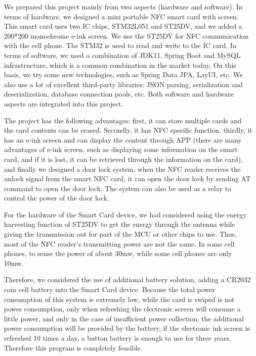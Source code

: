 \documentclass[11pt, a4paper]{article}
\begin{document}
We prepared this project mainly from two aspects (hardware and software). In terms of hardware, we designed a mini portable NFC smart card with screen. This smart card uses two IC chips, STM32L051 and ST25DV, and we added a 200*200 monochrome e-ink screen. We use the ST25DV for NFC communication with the cell phone. The STM32 is used to read and write to the IC card. In terms of software, we used a combination of JDK11, Spring Boot and MySQL infrastructure, which is a common combination in the market today. On this basis, we try some new technologies, such as Spring Data JPA, LayUI, etc. We also use a lot of excellent third-party libraries: JSON parsing, serialization and deserialization, database connection pools, etc. Both software and hardware aspects are integrated into this project.

The project has the following advantages: first, it can store multiple cards and the card contents can be erased. Secondly, it has NFC specific function, thirdly, it has an e-ink screen and can display the content through APP (there are many advantages of e-ink screen, such as displaying some information on the smart card, and if it is lost, it can be retrieved through the information on the card), and finally we designed a door lock system, when the NFC reader receives the unlock signal from the smart NFC card, it can open the door lock by sending AT command to open the door lock. The system can also be used as a relay to control the power of the door lock.

For the hardware of the Smart Card device, we had considered using the energy harvesting function of ST25DV to get the energy through the antenna while giving the transmission out for part of the MCU or other chips to use. Thus, most of the NFC reader's transmitting power are not the same. In some cell phones, to sense the power of about 30mw, while some cell phones are only 10mw.

Therefore, we considered the use of additional battery solution, adding a CR2032 coin cell battery into the Smart Card device. Because the total power consumption of this system is extremely low, while the card is swiped is not power consumption, only when refreshing the electronic screen will consume a little power, and only in the case of insufficient power collection, the additional power consumption will be provided by the battery, if the electronic ink screen is refreshed 10 times a day, a button battery is enough to use for three years. Therefore this program is completely feasible.


\nocite{*}
\printbibliography
\end{document}
